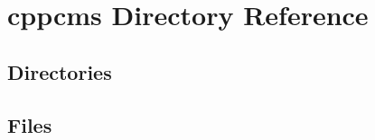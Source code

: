 \section{cppcms Directory Reference}
\label{dir_8c18e70309cc9e297cbe678abc284b34}
\subsection*{Directories}
\begin{DoxyCompactItemize}
\end{DoxyCompactItemize}
\subsection*{Files}
\begin{DoxyCompactItemize}
\end{DoxyCompactItemize}
